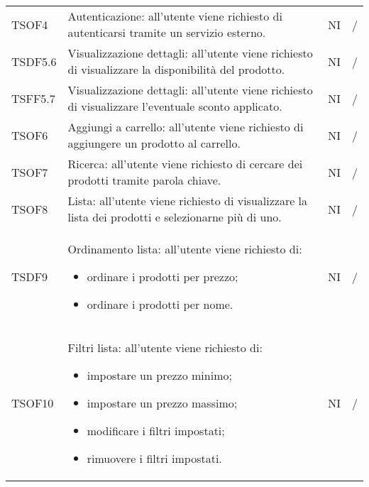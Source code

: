 \begin{center}
\begin{longtable}[!h]{p{60px} p{240px} p{35px} p{35px}}
        TSOF4                            & Autenticazione: all'utente viene richiesto di autenticarsi tramite un servizio esterno.                                                                             & NI             & /             \\
        TSDF5.6                          & Visualizzazione dettagli: all'utente viene richiesto di visualizzare la disponibilità del prodotto.                                                                 & NI             & /             \\
        TSFF5.7                          & Visualizzazione dettagli: all'utente viene richiesto di visualizzare l'eventuale sconto applicato.                                                                  & NI             & /             \\
        TSOF6                            & Aggiungi a carrello: all'utente viene richiesto di aggiungere un prodotto al carrello.                                                                              & NI             & /             \\
        TSOF7                            & Ricerca: all'utente viene richiesto di cercare dei prodotti tramite parola chiave.                                                                                  & NI             & /             \\
        TSOF8                            & Lista: all'utente viene richiesto di visualizzare la lista dei prodotti e selezionarne pi\`u di uno.                                                                & NI             & /             \\
        TSDF9                            & Ordinamento lista: all'utente viene richiesto di: \begin{itemize} \item ordinare i prodotti per prezzo; \item ordinare i prodotti per nome. \end{itemize}                                                                                         & NI             & /             \\
        TSOF10                           & Filtri lista: all'utente viene richiesto di: \begin{itemize} \item impostare un prezzo minimo; \item impostare un prezzo massimo; \item modificare i filtri impostati; \item rimuovere i filtri impostati. \end{itemize}                                                                                             & NI             & /             \\

\end{longtable}
\end{center}
